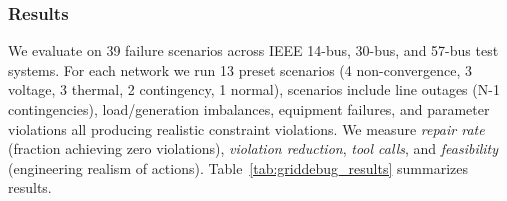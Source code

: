 \documentclass[journal,onecolumn]{IEEEtran} %
\begin{document}
\subsubsection*{\textbf{Results}}
We evaluate on 39 failure scenarios across IEEE 14-bus, 30-bus, and 57-bus test systems. For each network we run 13 preset scenarios (4 non-convergence, 3 voltage, 3 thermal, 2 contingency, 1 normal), scenarios include line outages (N-1 contingencies), load/generation imbalances, equipment failures, and parameter violations all producing realistic constraint violations. We measure \textit{repair rate} (fraction achieving zero violations), \textit{violation reduction}, \textit{tool calls}, and \textit{feasibility} (engineering realism of actions). Table~\ref{tab:griddebug_results} summarizes results.

\end{document}
